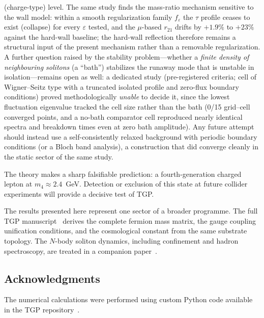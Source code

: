 \documentclass[11pt,a4paper]{article}
\begin{document}
(charge-type) level.  The same study finds the mass-ratio
mechanism sensitive to the wall model: within a smooth
regularization family $f_\varepsilon$ the $\tau$ profile ceases
to exist (collapse) for every $\varepsilon$ tested, and the
$\mu$-based $r_{21}$ drifts by $+1.9\%$ to $+23\%$ against the
hard-wall baseline; the hard-wall reflection therefore remains a
structural input of the present mechanism rather than a removable
regularization.  A further question raised by the stability
problem---whether a \emph{finite density of neighbouring solitons}
(a ``bath'') stabilizes the runaway mode that is unstable in
isolation---remains open as well: a dedicated study
(pre-registered criteria; cell of Wigner--Seitz type with a
truncated isolated profile and zero-flux boundary conditions)
proved methodologically \emph{unable} to decide it, since the
lowest fluctuation eigenvalue tracked the cell size rather than
the bath (0/15 grid--cell converged points, and a no-bath
comparator cell reproduced nearly identical spectra and breakdown
times even at zero bath amplitude).  Any future attempt should
instead use a self-consistently relaxed background with periodic
boundary conditions (or a Bloch band analysis), a construction
that did converge cleanly in the static sector of the same study.

The theory makes a sharp falsifiable prediction: a
fourth-generation charged lepton at $m_4 \approx 2.4$~GeV.
Detection or exclusion of this state at future collider
experiments will provide a decisive test of TGP.

The results presented here represent one sector of a broader
programme.  The full TGP manuscript~\cite{Serafin2026-full}
derives the complete fermion mass matrix, the gauge coupling
unification conditions, and the cosmological constant from the
same substrate topology.  The $N$-body soliton dynamics,
including confinement and hadron spectroscopy, are treated in
a companion paper~\cite{Serafin2026-nbody}.

\subsection*{Acknowledgments}

The numerical calculations were performed using custom Python
code available in the TGP repository~\cite{TGP-repo}.



\end{document}
